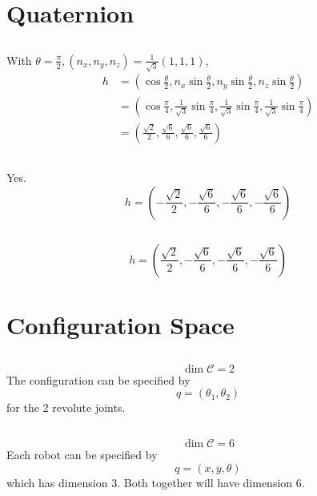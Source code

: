 \newpage
\section{Quaternion}
\subsection{}
With $\theta=\frac{\pi}{2},(n_x,n_y,n_z)=\frac{1}{\sqrt{3}}(1,1,1)$,
\begin{equation}
\begin{aligned}
    h&=(\cos\frac{\theta}{2},n_x \sin\frac{\theta}{2},
    n_y \sin\frac{\theta}{2},n_z \sin\frac{\theta}{2})\\
    &=(\cos\frac{\pi}{4}, \frac{1}{\sqrt{3}}\sin\frac{\pi}{4},
    \frac{1}{\sqrt{3}}\sin\frac{\pi}{4},
    \frac{1}{\sqrt{3}}\sin\frac{\pi}{4})\\
    &=(\frac{\sqrt{2}}{2}, \frac{\sqrt{6}}{6}, 
    \frac{\sqrt{6}}{6}, \frac{\sqrt{6}}{6})
\end{aligned}
\end{equation}

\subsection{}
Yes.
\[h=(-\frac{\sqrt{2}}{2}, -\frac{\sqrt{6}}{6}, 
-\frac{\sqrt{6}}{6}, -\frac{\sqrt{6}}{6})\]

\subsection{}
\[h=(\frac{\sqrt{2}}{2}, -\frac{\sqrt{6}}{6}, 
-\frac{\sqrt{6}}{6}, -\frac{\sqrt{6}}{6})\]

\newpage
\section{Configuration Space}
\subsection{}
\[\dim\mathcal{C}=2\]
The configuration can be specified by 
\[q=(\theta_1,\theta_2)\]
for the 2 revolute joints.

\subsection{}
\[\dim\mathcal{C}=6\]
Each robot can be specified by
\[q=(x,y,\theta)\]
which has dimension 3. Both together will have dimension 6.

